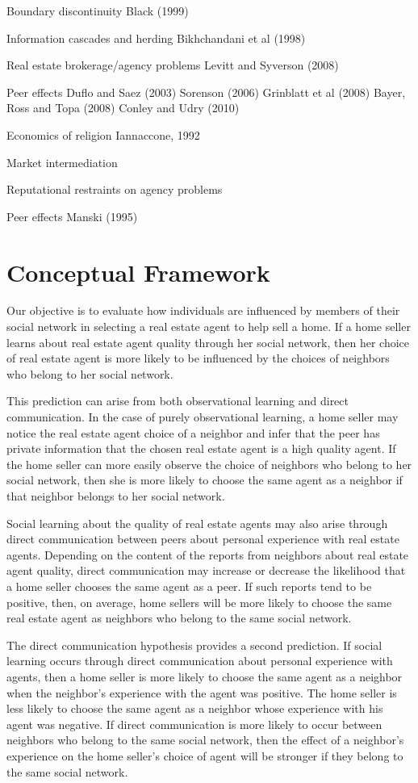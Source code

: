 \documentclass[12pt]{article}
\begin{document}
Boundary discontinuity
Black (1999)

Information cascades and herding
Bikhchandani et al (1998)

Real estate brokerage/agency problems
Levitt and Syverson (2008)

Peer effects
Duflo and Saez (2003)
Sorenson (2006)
Grinblatt et al (2008)
Bayer, Ross and Topa (2008)
Conley and Udry (2010)
    
Economics of religion
Iannaccone, 1992

Market intermediation

Reputational restraints on agency problems

Peer effects
Manski (1995)

\section{Conceptual Framework}

    Our objective is to evaluate how individuals are influenced by members of their social network in selecting a real estate agent to help sell a
    home. If a home seller learns about real estate agent quality through her social network, then her choice of real estate agent is more likely
    to be influenced by the choices of neighbors who belong to her social network.

    This prediction can arise from both observational learning and direct communication. In the case of purely observational learning,
    a home seller may notice the real estate agent choice of a neighbor and infer that the peer has private information that the chosen real estate
    agent is a high quality agent. If the home seller can more easily observe the choice of neighbors who belong to her social network, then she is
    more likely to choose the same agent as a neighbor if that neighbor belongs to her social network.

    Social learning about the quality of real estate agents may also arise through direct communication between peers about personal experience with
    real estate agents. Depending on the content of the reports from neighbors about real estate agent quality, direct communication may increase or decrease the likelihood that a home seller
    chooses the same agent as a peer. If such reports tend to be positive, then, on average, home sellers will be more likely to choose the same real
    estate agent as neighbors who belong to the same social network.

    The direct communication hypothesis provides a second prediction. If social learning occurs through direct communication about personal
    experience with agents, then a home seller is more likely to choose the same agent as a neighbor when the neighbor's experience with the agent was
    positive. The home seller is less likely to choose the same agent as a neighbor whose experience with his agent was negative. If direct
    communication is more likely to occur between neighbors who belong to the same social network, then the effect of a neighbor's experience on the
    home seller's choice of agent will be stronger if they belong to the same social network.
\end{document}
